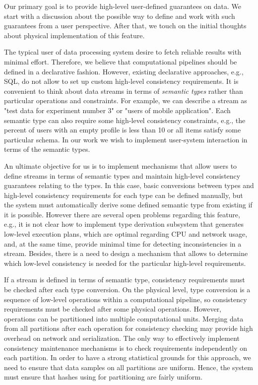 \label{fs-phd-reliable}

Our primary goal is to provide high-level user-defined guarantees on data. We start with a discussion about the possible way to define and work with such guarantees from a user perspective. After that, we touch on the initial thoughts about physical implementation of this feature.

The typical user of data processing system desire to fetch reliable results with minimal effort. Therefore, we believe that computational pipelines should be defined in a declarative fashion. However, existing declarative approaches, e.g., SQL, do not allow to set up custom high-level consistency requirements. It is convenient to think about data streams in terms of {\em semantic types} rather than particular operations and constraints. For example, we can describe a stream as "test data for experiment number 3" or "users of mobile application". Each semantic type can also require some high-level consistency constraints, e.g., the percent of users with an empty profile is less than 10 or all items satisfy some particular schema. In our work we wish to implement user-system interaction in terms of the semantic types.

An ultimate objective for us is to implement mechanisms that allow users to define streams in terms of semantic types and maintain high-level consistency guarantees relating to the types. In this case, basic conversions between types and high-level consistency requirements for each type can be defined manually, but the system must automatically derive some defined semantic type from existing if it is possible. However there are several open problems regarding this feature, e.g., it is not clear how to implement type derivation subsystem that generates low-level execution plans, which are optimal regarding CPU and network usage, and, at the same time, provide minimal time for detecting inconsistencies in a stream. Besides, there is a need to design a mechanism that allows to determine which low-level consistency is needed for the particular high-level requirements.  

If a stream is defined in terms of semantic type, consistency requirements must be checked after each type conversion. On the physical level, type conversion is a sequence of low-level operations within a computational pipeline, so consistency requirements must be checked after some physical operations. However, operations can be partitioned into multiple computational units. Merging data from all partitions after each operation for consistency checking may provide high overhead on network and serialization. The only way to effectively implement consistency maintenance mechanisms is to check requirements independently on each partition. In order to have a strong statistical grounds for this approach, we need to ensure that data samples on all partitions are uniform. Hence, the system must ensure that hashes using for partitioning are fairly uniform.

